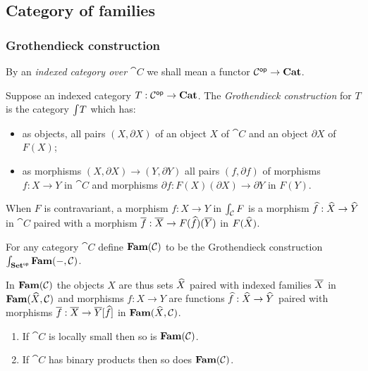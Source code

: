\subsection{Category of families}
\label{sec:grothendieck}

\subsubsection{Grothendieck construction}

By an \emph{indexed category over $\cat{C}$} we shall mean a functor $\mathcal{C}^{\mathsf{op}} \to \mathbf{Cat}$.

\begin{definition}
Suppose an indexed category $T: \mathcal{C}^{\mathsf{op}} \to \mathbf{Cat}$. The \emph{Grothendieck construction}
for $T$ is the category $\int_{}T$ which has:
\begin{itemize}
\item as objects, all pairs $(X, \partial X)$ of an object $X$ of $\cat{C}$ and an object $\partial X$ of $F(X)$;
\item as morphisms $(X, \partial X) \to (Y, \partial Y)$ all pairs $(f, \partial f)$ of morphisms $f: X
\to Y$ in $\cat{C}$ and morphisms $\partial f: F(X)(\partial X) \to \partial Y$ in $F(Y)$.
\end{itemize}
\end{definition}

\noindent When $F$ is contravariant, a morphism $f: X \to Y$ in $\int_{\mathcal{C}}{F}$ is a morphism
$\widehat{f}: \widehat{X} \to \widehat{Y}$ in $\cat{C}$ paired with a morphism $\overline{f}: \overline{X} \to
F(\widehat{f})(\overline{Y})$ in $F(\widehat{X})$. 

\begin{definition}
For any category $\cat{C}$ define $\mathbf{Fam}(\mathcal{C})$ to be the Grothendieck construction
$\int_{\mathbf{Set}^{\mathsf{op}}}\mathbf{Fam}(-,\mathcal{C})$.
\end{definition}

\noindent In $\mathbf{Fam}(\mathcal{C})$ the objects $X$ are thus sets $\widehat{X}$ paired with indexed families $\overline{X}$
in $\mathbf{Fam}(\widehat{X},\mathcal{C})$ and morphisms $f: X \to Y$ are functions $\widehat{f}: \widehat{X} \to \widehat{Y}$ paired with
morphisms $\overline{f}: \overline{X} \to \overline{Y}[\widehat{f}]$ in $\mathbf{Fam}(\widehat{X},\mathcal{C})$.

\begin{proposition}
\item
\begin{enumerate}
\item If $\cat{C}$ is locally small then so is $\mathbf{Fam}(\mathcal{C})$.
\item If $\cat{C}$ has binary products then so does $\mathbf{Fam}(\mathcal{C})$.
\end{enumerate}
\end{proposition}

